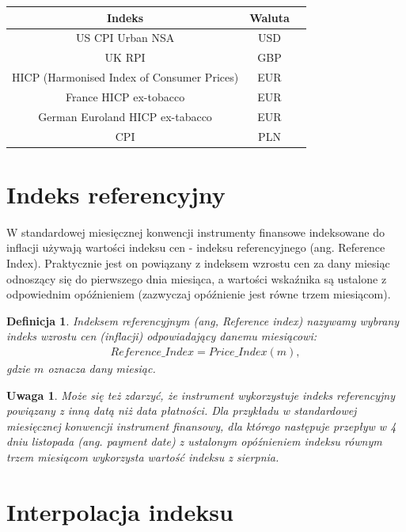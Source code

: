 \documentclass{mini}
\theoremstyle{mythstyle}
\newtheorem{Definicja}{Definicja}[chapter]
\newtheorem{Uwaga}{Uwaga}[chapter]
\begin{document}
	\begin{center}
		\begin{tabular}{c  c c}
			\textbf{Indeks} & \textbf{Waluta}  \\ \hline
			US CPI Urban NSA & USD \\
			UK RPI & GBP \\
			HICP (Harmonised Index of Consumer Prices) & EUR \\
			France HICP ex-tobacco & EUR \\
			German Euroland HICP ex-tabacco & EUR  \\
			CPI & PLN \\
		\end{tabular}
	\end{center}

	\section{Indeks referencyjny}
	W standardowej miesięcznej konwencji instrumenty finansowe indeksowane do inflacji używają wartości indeksu cen - indeksu referencyjnego (ang. Reference Index). Praktycznie jest on powiązany z indeksem wzrostu cen za dany miesiąc odnoszący się do pierwszego dnia miesiąca, a wartości wskaźnika są ustalone z odpowiednim opóźnieniem (zazwyczaj opóźnienie jest równe trzem miesiącom).\\
	\begin{Definicja}
		Indeksem referencyjnym (ang, Reference index) nazywamy wybrany indeks wzrostu cen (inflacji) odpowiadający danemu miesiącowi:
	\begin{eqnarray*}
		Reference\_Index = Price\_Index(m),
	\end{eqnarray*}
	gdzie $m$ oznacza dany miesiąc.\\
	\end{Definicja}
	\begin{Uwaga}
	Może się też zdarzyć, że instrument wykorzystuje indeks referencyjny powiązany z inną datą niż data płatności. Dla przykładu w standardowej miesięcznej konwencji instrument finansowy, dla którego następuje przepływ w 4 dniu listopada (ang. payment date) z ustalonym opóźnieniem indeksu równym trzem miesiącom wykorzysta wartość indeksu z sierpnia. 
	\end{Uwaga}

	\section{Interpolacja indeksu}
	
\end{document}
